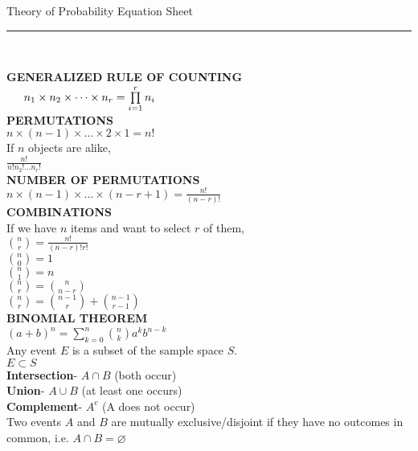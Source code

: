 \documentclass [8pt] {article}
\begin{document}
Theory of Probability Equation Sheet \\
\rule{7.6in}{0.4pt}\\
\begin{multicols*}{2}
\hspace{-7mm} \textbf{GENERALIZED RULE OF COUNTING} \\
$\indent n_1 \times n_2 \times \dots \times n_r = \prod\limits_{i=1}^r n_i$ \\
\textbf{PERMUTATIONS} \\
\indent $n \times (n-1) \times \dots \times 2 \times 1 = n!$ \vspace{2mm} \\
If $n$ objects are alike, \\
\indent $\frac{n!}{n!n_2!\dots n_r!}$ \vspace{3mm} \\
\textbf{NUMBER OF PERMUTATIONS} \\
\indent $n \times (n-1) \times \dots \times (n - r + 1) = \frac{n!}{(n-r)!}$ \vspace{2mm} \\
\textbf{COMBINATIONS} \\
If we have $n$ items and want to select $r$ of them, \\
\indent ${n \choose r} = \frac{n!}{(n-r)!r!}$ \\
\indent ${n \choose 0} = 1 $\\
\indent ${n \choose 1} = n $\\
\indent ${n \choose r} = {n \choose n-r} $\\
\indent ${n \choose r} = {n-1 \choose r} + {n-1 \choose r-1} $ \vspace{2mm}\\
\textbf{BINOMIAL THEOREM} \\
\indent $(a+b)^n = \sum\limits_{k=0}^n {n \choose k}a^kb^{n-k}$ \vspace{1mm} \\
Any event $E$ is a subset of the sample space $S$. \\
\indent $E \subset S$ \\
\indent \textbf{Intersection}- $A \cap B$ (both occur) \\
\indent \textbf{Union}- $A \cup B$ (at least one occurs) \\
\indent \textbf{Complement}- $A^c$ (A does not occur) \\
Two events $A$ and $B$ are mutually exclusive/disjoint if they have no outcomes in common, i.e. $A \cap B = \varnothing $ \\

\end{multicols*}
\end{document}
